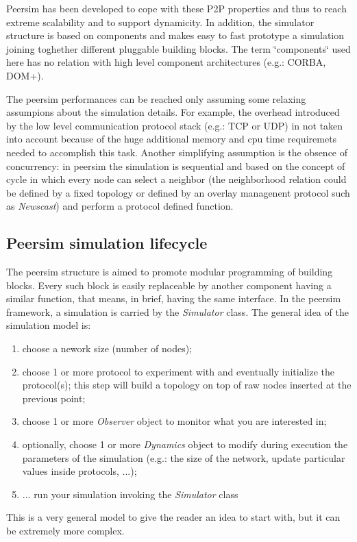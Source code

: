 \documentclass[a4paper,12pt]{article}
\begin{document}
Peersim has been developed to cope with these P2P properties and thus
to reach extreme scalability and to support dynamicity. In addition,
the simulator structure is based on components and makes easy to fast
prototype a simulation joining toghether different pluggable building
blocks. The term \char`\"{}components\char`\"{} used here has no relation
with high level component architectures (e.g.: CORBA, DOM+).

The peersim performances can be reached only assuming some relaxing
assumpions about the simulation details. For example, the overhead
introduced by the low level communication protocol stack (e.g.: TCP
or UDP) in not taken into account because of the huge additional memory
and cpu time requiremets needed to accomplish this task. Another simplifying
assumption is the obsence of concurrency: in peersim the simulation
is sequential and based on the concept of cycle in which every node
can select a neighbor (the neighborhood relation could be defined
by a fixed topology or defined by an overlay managenent protocol such
as \emph{Newscast}) and perform a protocol defined function.


\subsection{Peersim simulation lifecycle}

The peersim structure is aimed to promote modular programming of building
blocks. Every such block is easily replaceable by another component
having a similar function, that means, in brief, having the same interface.
In the peersim framework, a simulation is carried by the \emph{Simulator}
class. The general idea of the simulation model is: 

\begin{enumerate}
\item choose a nework size (number of nodes); 
\item choose 1 or more protocol to experiment with and eventually initialize
the protocol(s); this step will build a topology on top of raw nodes
inserted at the previous point;
\item choose 1 or more \emph{Observer} object to monitor what you are interested
in; 
\item optionally, choose 1 or more \emph{Dynamics} object to modify during
execution the parameters of the simulation (e.g.: the size of the
network, update particular values inside protocols, ...); 
\item ... run your simulation invoking the \emph{Simulator} class
\end{enumerate}
This is a very general model to give the reader an idea to start with,
but it can be extremely more complex. 
\end{document}
